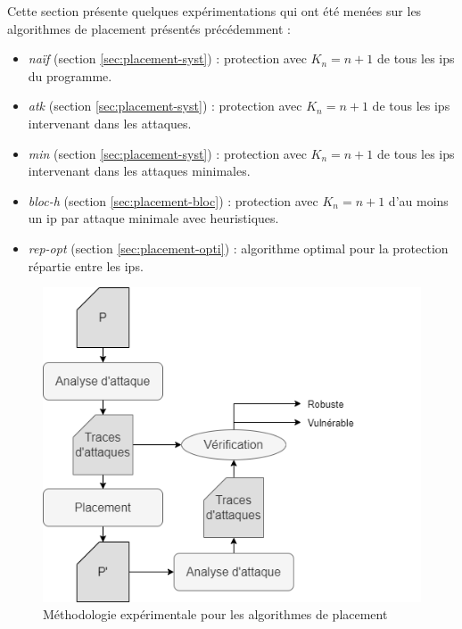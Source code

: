         Cette section présente quelques expérimentations qui ont été menées sur les algorithmes de placement présentés précédemment : 
        \begin{itemize}
            \item \textit{naïf} (section \ref{sec:placement-syst}) : protection avec $K_n = n+1$ de tous les \gls{ip}s du programme.
            \item \textit{atk} (section \ref{sec:placement-syst}) : protection avec $K_n = n+1$ de tous les \gls{ip}s intervenant dans les attaques.
            \item \textit{min} (section \ref{sec:placement-syst}) : protection avec $K_n = n+1$ de tous les \gls{ip}s intervenant dans les attaques minimales.
            \item \textit{bloc-h} (section \ref{sec:placement-bloc}) : protection avec $K_n = n+1$ d'au moins un \gls{ip} par attaque minimale avec heuristiques.
            \item \textit{rep-opt} (section \ref{sec:placement-opti}) : algorithme optimal pour la protection répartie entre les \gls{ip}s.
        \end{itemize}
            
        \begin{figure}[!h]\centering
            \includegraphics[scale=0.45]{ch5-placement/img/placement-exps.drawio.png}
            \caption{Méthodologie expérimentale pour les algorithmes de placement}
            \label{fig:placement-exp-clpp}
        \end{figure}
        
